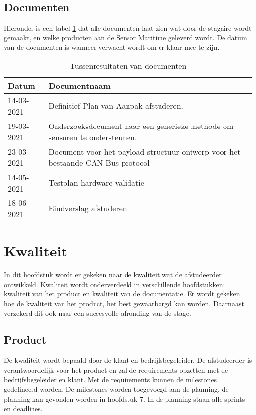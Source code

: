 \subsection{Documenten}
Hieronder is een tabel \ref{tab:documents} dat alle documenten laat zien wat door de stagaire wordt gemaakt, en welke producten aan de Sensor Maritime geleverd wordt. De datum van de documenten is wanneer verwacht wordt om er klaar mee te zijn.
\begin{table}[h!]
	\caption{Tussenresultaten van documenten}
	\begin{tabular}{p{3cm}p{12cm}}
	\toprule
	\textbf{Datum} & \textbf{Documentnaam}   \\ \midrule
	14-03-2021 & Definitief Plan van Aanpak afstuderen. \\
	19-03-2021 & Onderzoeksdocument naar een generieke methode om sensoren te ondersteunen. \\
	23-03-2021 & Document voor het payload structuur ontwerp voor het bestaande CAN Bus protocol \\
	14-05-2021 & Testplan hardware validatie \\
	18-06-2021 & Eindverslag afstuderen \\ \bottomrule
	\end{tabular}

\label{tab:documents}
\end{table}

\newpage
\section{Kwaliteit}
In dit hoofdstuk wordt er gekeken naar de kwaliteit wat de afstudeerder ontwikkeld. Kwaliteit wordt onderverdeeld in verschillende hoofdstukken: kwaliteit van het product en kwaliteit van de documentatie. Er wordt gekeken hoe de kwaliteit van het product, het best gewaarborgd kan worden. Daarnaast verzekerd dit ook naar een succesvolle afronding van de stage.

\subsection{Product}
De kwaliteit wordt bepaald door de klant en bedrijfsbegeleider. De afstudeerder is verantwoordelijk voor het product en zal de requirements opzetten met de bedrijfsbegeleider en klant. Met de requirements kunnen de milestones gedefineerd worden. De milestones worden toegevoegd aan de planning, de planning kan gevonden worden in hoofdstuk 7. In de planning staan alle sprints en deadlines. \newline

